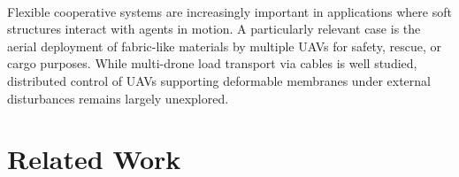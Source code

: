 \documentclass[11pt]{article}
\begin{document}
\paragraph{}
Flexible cooperative systems are increasingly important in applications where soft structures interact with agents in motion. A particularly relevant case is the aerial deployment of fabric-like materials by multiple UAVs for safety, rescue, or cargo purposes. While multi-drone load transport via cables is well studied, distributed control of UAVs supporting deformable membranes under external disturbances remains largely unexplored.



\section{Related Work}
\end{document}
